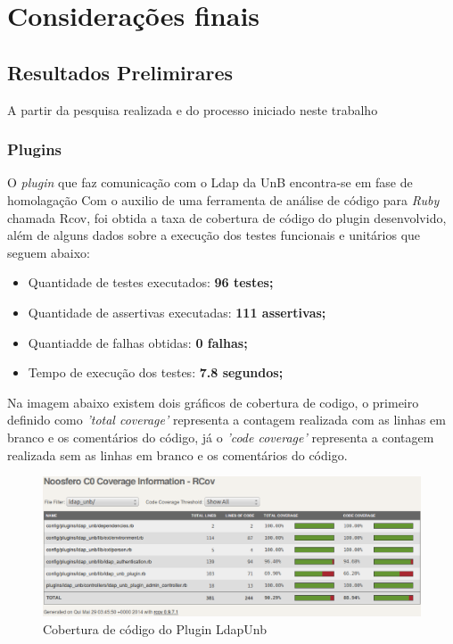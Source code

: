 \chapter{Considerações finais}
\label{consideracoes-finais}


\section{Resultados Prelimirares}
\label{results}

A partir da pesquisa realizada e do processo iniciado neste trabalho
\subsection{Plugins}

O \textit{plugin} que faz comunicação com o Ldap da UnB encontra-se em fase de homolagação
Com o auxilio de uma ferramenta de análise de código para \textit{Ruby} chamada Rcov, foi obtida a taxa de cobertura de código do plugin desenvolvido, além de alguns dados sobre a execução dos testes funcionais e unitários que seguem abaixo:

\begin{itemize}
\item Quantidade de testes executados: \textbf{96 testes;}
\item Quantidade de assertivas executadas: \textbf{111 assertivas;}
\item Quantiadde de falhas obtidas: \textbf{0 falhas;}
\item Tempo de execução dos testes: \textbf{7.8 segundos;}
\end{itemize}

Na imagem abaixo existem dois gráficos de cobertura de codigo, o primeiro definido como \textit{'total coverage'} representa a contagem realizada com as linhas em branco e os comentários do código, já o \textit{'code coverage'} representa a contagem realizada sem as linhas em branco e os comentários do código.

%
\begin{figure}[!h]
    \centering
    \includegraphics[keepaspectratio=false,scale=0.45]
      {figuras/cobertura_teste.eps}
    \caption{Cobertura de código do Plugin LdapUnb}
    \label{consideracoes_cobertura1}
\end{figure}
%


